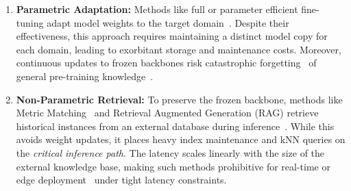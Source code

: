 \begin{enumerate}[leftmargin=*]
    \item \textbf{Parametric Adaptation:} Methods like full or parameter efficient fine-tuning adapt model weights to the target domain~\cite{qiao2025multi,zhao2025less,ruan2025st}. Despite their effectiveness, this approach requires maintaining a distinct model copy for each domain, leading to exorbitant storage and maintenance costs. Moreover, continuous updates to frozen backbones risk catastrophic forgetting~\cite{fu2025financial,beichter2025decision,yu2025time} of general pre-training knowledge~\cite{ning2025mode,lee2025lightweight,ye2023mlora,karaouli2025time}.

    \item \textbf{Non-Parametric Retrieval:} To preserve the frozen backbone, methods like Metric Matching~\cite{vinyals2016matching,snell2017prototypical,sung2018learning} and Retrieval Augmented Generation (RAG) retrieve historical instances from an external database during inference~\cite{lewis2020retrieval,jing2022retrieval,liu2024retrieval,yang2025timerag,han2025retrieval,ruan2025rastretrievalaugmentedspatiotemporal}. While this avoids weight updates, it places heavy index maintenance and kNN queries on the \textit{critical inference path}. The latency scales linearly with the size of the external knowledge base, making such methods prohibitive for real-time or edge deployment~\cite{fan2024survey,ning2025ts,jin2025ragcache,zhu2024accelerating,asai2024reliable,lei2025game} under tight latency constraints.
\end{enumerate}




